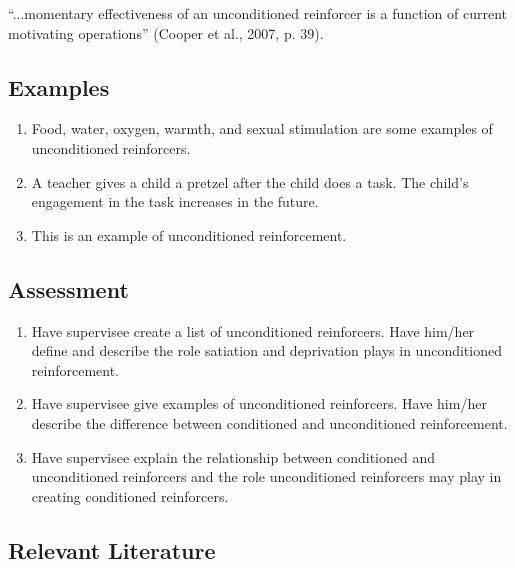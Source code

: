 ``...momentary effectiveness of an unconditioned reinforcer is a function of current motivating operations'' (Cooper et al., 2007, p. 39).
%
\subsection{Examples}
\begin{enumerate}
\item Food, water, oxygen, warmth, and sexual stimulation are some examples of unconditioned reinforcers.
\item A teacher gives a child a pretzel after the child does a task. The child's engagement in the task increases in the future. 
\item This is an example of unconditioned reinforcement.
%
\end{enumerate}
%
\subsection{Assessment}
\begin{enumerate}
\item Have supervisee create a list of unconditioned reinforcers. Have him/her define and describe the role satiation and deprivation plays in unconditioned reinforcement. 
\item Have supervisee give examples of unconditioned reinforcers. Have him/her describe the difference between conditioned and unconditioned reinforcement.
\item Have supervisee explain the relationship between conditioned and unconditioned reinforcers and the role unconditioned reinforcers may play in creating conditioned reinforcers.
\end{enumerate}
%
\subsection{Relevant Literature}
\begin{refsection}
\nocite{test,alang2017police,clayton2018black}
\printbibliography[heading=none]
\end{refsection}
%
